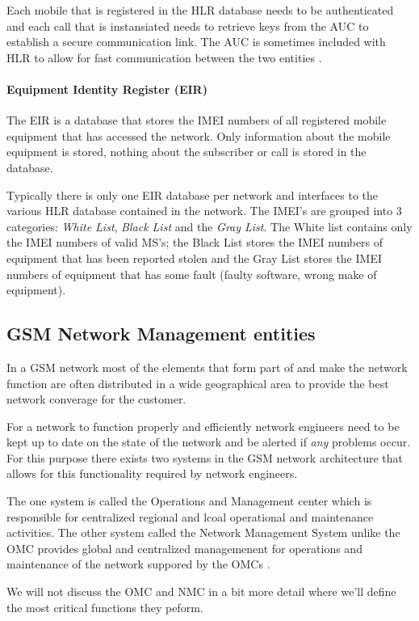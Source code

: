 Each mobile that is registered in the HLR database needs to be authenticated and each call that is instansiated needs to retrieve keys from the AUC to establish a secure communication link. The AUC is sometimes included with HLR to allow for fast communication between the two entities \cite{GSMSysEngin}.

\paragraph{Equipment Identity Register (EIR)}
The EIR is a database that stores the IMEI numbers of all registered mobile equipment that has accessed the network. Only information about the mobile equipment is stored, nothing about the subscriber or call is stored in the database.

Typically there is only one EIR database per network and interfaces to the various HLR database contained in the network. The IMEI's are grouped into 3 categories: \emph{White List}, \emph{Black List} and the \emph{Gray List}. The White list contains only the IMEI numbers of valid MS's; the Black List stores the IMEI numbers of equipment that has been reported stolen and the Gray List stores the IMEI numbers of equipment that has some fault (faulty software, wrong make of equipment).

\subsection{GSM Network Management entities}
In a GSM network most of the elements that form part of and make the network function are often distributed in a wide geographical area to provide the best network converage for the customer. 

For a network to function properly and efficiently network engineers need to be kept up to date on the state of the network and be alerted if \emph{any} problems occur. For this purpose there exists two systems in the GSM network architecture that allows for this functionality required by network engineers. 

The one system is called the Operations and Management center which is responsible for centralized regional and lcoal operational and maintenance activities. The other system called the Network Management System unlike the OMC provides global and centralized managemenent for operations and maintenance of the network suppored by the OMCs \cite{GSMSysEngin}.

We will not discuss the OMC and NMC in a bit more detail where we'll define the most critical functions they peform.


